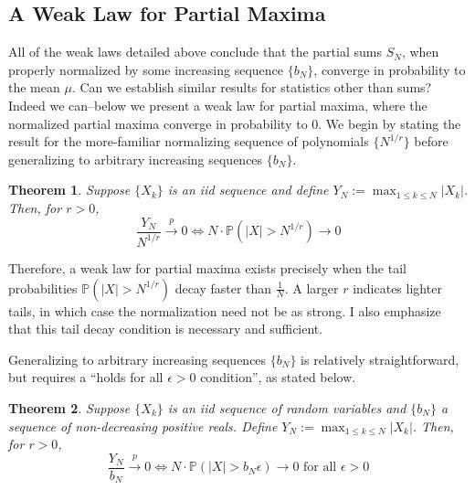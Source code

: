 \documentclass[12pt]{article}
\newcommand*{\abs}[1]{\left\lvert#1\right\rvert}
\newcommand{\Prob}{\mathbb{P}}
\newtheorem{thm}{Theorem}
\begin{document}
\subsection{A Weak Law for Partial Maxima}
All of the weak laws detailed above conclude that the partial sums $S_N$, when properly normalized by some increasing sequence $\{b_N\}$, converge in probability to the mean $\mu$. Can we establish 
similar results for statistics other than sums? Indeed we can--below we  present a weak law for partial maxima, where the normalized partial maxima converge in probability to $0$. We begin by stating the result
for the more-familiar normalizing sequence of polynomials $\{N^{1/r}\}$ before generalizing to arbitrary increasing sequences $\{b_N\}$. 

\begin{thm}
Suppose $\{X_k\}$ is an iid sequence and define $Y_N := \max_{1 \leq k \leq N} \abs{X_k}$. Then, for $r > 0$, 
\[\frac{Y_N}{N^{1/r}} \overset{p}{\to} 0 \iff N \cdot \Prob(\abs{X} > N^{1/r}) \to 0\]
\end{thm}
Therefore, a weak law for partial maxima exists precisely when the tail  probabilities $\Prob(\abs{X} > N^{1/r})$ decay faster than $\frac{1}{N}$. A larger $r$ indicates lighter tails, in which case the 
normalization need not be as strong. I also emphasize that this tail decay condition is necessary and sufficient. 

Generalizing to arbitrary increasing sequences $\{b_N\}$ is relatively straightforward, but requires a ``holds for all $\epsilon > 0$ condition'', as stated below. 
\begin{thm}
Suppose $\{X_k\}$ is an iid sequence of random variables and $\{b_N\}$ a sequence of non-decreasing positive reals. Define $Y_N := \max_{1 \leq k \leq N} \abs{X_k}$. Then, for $r > 0$, 
\[\frac{Y_N}{b_N} \overset{p}{\to} 0 \iff N \cdot \Prob(\abs{X} > b_N \epsilon) \to 0 \text{ for all } \epsilon > 0\]
\end{thm}
\end{document}
